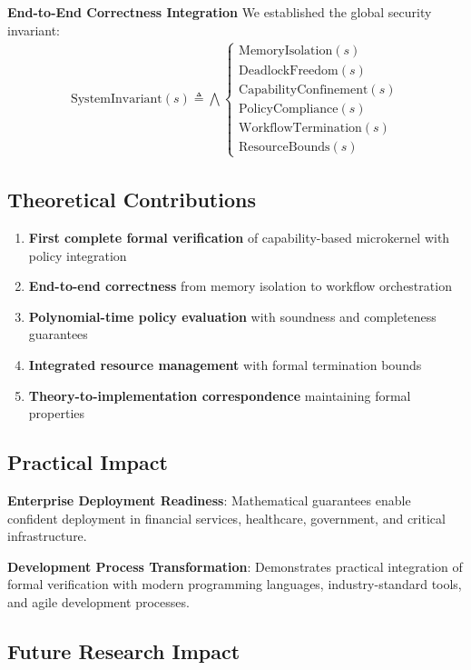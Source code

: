 \textbf{End-to-End Correctness Integration}
We established the global security invariant:
\begin{align}
\text{SystemInvariant}(s) \triangleq \bigwedge \begin{cases}
\text{MemoryIsolation}(s) \\
\text{DeadlockFreedom}(s) \\
\text{CapabilityConfinement}(s) \\
\text{PolicyCompliance}(s) \\
\text{WorkflowTermination}(s) \\
\text{ResourceBounds}(s)
\end{cases}
\end{align}

\subsection{Theoretical Contributions}

\begin{enumerate}
\item \textbf{First complete formal verification} of capability-based microkernel with policy integration
\item \textbf{End-to-end correctness} from memory isolation to workflow orchestration
\item \textbf{Polynomial-time policy evaluation} with soundness and completeness guarantees
\item \textbf{Integrated resource management} with formal termination bounds
\item \textbf{Theory-to-implementation correspondence} maintaining formal properties
\end{enumerate}

\subsection{Practical Impact}

\textbf{Enterprise Deployment Readiness}: Mathematical guarantees enable confident deployment in financial services, healthcare, government, and critical infrastructure.

\textbf{Development Process Transformation}: Demonstrates practical integration of formal verification with modern programming languages, industry-standard tools, and agile development processes.

\subsection{Future Research Impact}

